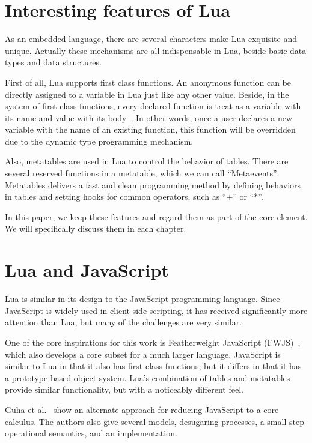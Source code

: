 \section{Interesting features of Lua}
As an embedded language, there are several characters make Lua exquisite and unique. 
Actually these mechanisms are all indispensable in Lua, beside basic data types and data structures.

First of all, Lua supports first class functions.
An anonymous function can be directly assigned to a variable in Lua just like any other value.
Beside, in the system of first class functions, every declared function is treat as a variable with its name and value with its body~\cite{FCV}.
In other words, once a user declares a new variable with the name of an existing function, this function will be overridden due to the dynamic type programming mechanism.

Also, metatables are used in Lua to control the behavior of tables.
There are several reserved functions in a metatable, which we can call ``Metaevents''.
Metatables delivers a fast and clean programming method by defining behaviors in tables and setting hooks for common operators, such as ``+'' or ``*''.

In this paper, we keep these features and regard them as part of the core element.
We will specifically discuss them in each chapter.

\section{Lua and JavaScript}
Lua is similar in its design to the JavaScript programming language.
Since JavaScript is widely used in client-side scripting,
it has received significantly more attention than Lua,
but many of the challenges are very similar.

One of the core inspirations for this work is Featherweight JavaScript (FWJS)~\cite{FWJS},
which also develops a core subset for a much larger language.
JavaScript is similar to Lua in that it also has first-class functions,
but it differs in that it has a prototype-based object system.
Lua's combination of tables and metatables provide similar functionality,
but with a noticeably different feel.

Guha et al.~\cite{EOJS} show an alternate approach for reducing JavaScript to a core calculus. The authors also give several models, desugaring processes, a small-step operational semantics, and an implementation.

